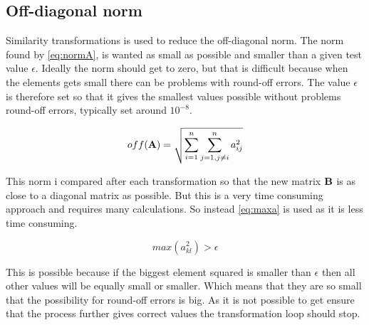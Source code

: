 

\subsection*{Off-diagonal norm}

Similarity transformations is used to reduce the off-diagonal norm. The norm found by \eqref{eq:normA}, is wanted as small as possible and smaller than a given test value $\epsilon $. Ideally the norm should get to zero, but that is difficult because when the elements gets small there can be problems with round-off errors. The value $\epsilon $ is therefore set so that it gives the smallest values possible without problems round-off errors, typically set around $10^{-8}$.  

\begin{equation}
	off(\mbox{\textbf{A}}) = \sqrt{\sum_{i=1}^n\sum_{j=1,j \ne i}^n a_{ij}^2}
	\label{eq:normA}
\end{equation} 


This norm i compared after each transformation so that the new matrix $\mbox{\textbf{B}}$ is as close to a diagonal matrix as possible. But this is a very time consuming approach and requires many calculations. So instead \eqref{eq:maxa} is used as it is less time consuming. 

\begin{equation*}
	max(a_{kl}^2) > \epsilon
	\label{eq:maxa}
\end{equation*}

This is possible because if the biggest element squared is smaller than $\epsilon$ then all other values will be equally small or smaller. Which means that they are so small that the possibility for round-off errors is big. As it is not possible to get ensure that the process further gives correct values the transformation loop should stop. 







